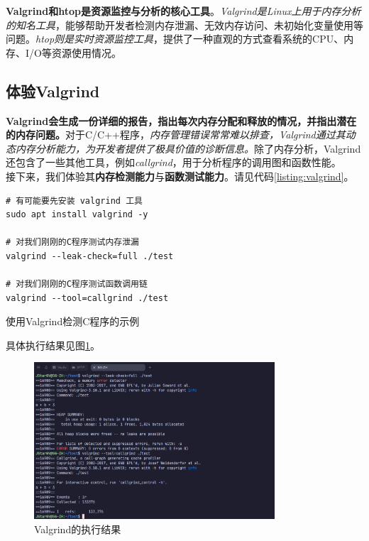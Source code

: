 \textbf{Valgrind和htop是资源监控与分析的核心工具}。\textit{Valgrind是Linux上用于内存分析的知名工具}，能够帮助开发者检测内存泄漏、无效内存访问、未初始化变量使用等问题。\textit{htop则是实时资源监控工具}，提供了一种直观的方式查看系统的CPU、内存、I/O等资源使用情况。

\subsection{体验Valgrind}

\textbf{Valgrind会生成一份详细的报告，指出每次内存分配和释放的情况，并指出潜在的内存问题。}对于C/C++程序，\textit{内存管理错误常常难以排查，Valgrind通过其动态内存分析能力，为开发者提供了极具价值的诊断信息。}除了内存分析，Valgrind还包含了一些其他工具，例如\textit{callgrind}，用于分析程序的调用图和函数性能。\\

接下来，我们体验其\textbf{内存检测能力}与\textbf{函数测试能力}。请见代码\ref{listing:valgrind}。\\

\begin{longlisting}
    \begin{verbatim}
# 有可能要先安装 valgrind 工具
sudo apt install valgrind -y

# 对我们刚刚的C程序测试内存泄漏
valgrind --leak-check=full ./test

# 对我们刚刚的C程序测试函数调用链
valgrind --tool=callgrind ./test
    \end{verbatim}
    \caption{使用Valgrind检测C程序的示例}
    \label{listing:valgrind}
\end{longlisting}

具体执行结果见图\ref{fig:valgrind}。\\

\begin{figure}[!htbp]
    \centering
    \includegraphics[width=0.8\textwidth]{Figures/valgrind.png}
    \caption{Valgrind的执行结果}
    \label{fig:valgrind}
\end{figure}